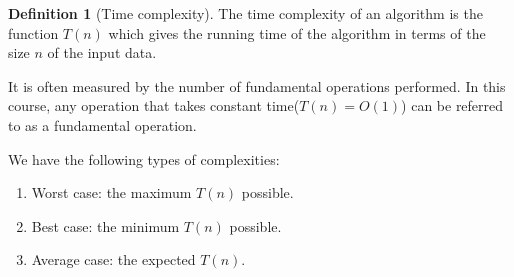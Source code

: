\documentclass[10pt, a4paper]{extarticle}
\theoremstyle{definition}
\newtheorem{defn}{Definition}
\begin{document}
	\begin{defn}[Time complexity]
		The time complexity of an algorithm is the function $T(n)$ which gives the running time of the algorithm in terms of the size $n$ of the input data.

		It is often measured by the number of fundamental operations performed. In this course, any operation that takes constant time($T(n)=O(1)$) can be referred to as a fundamental operation.

		We have the following types of complexities:
		\begin{enumerate}
			\item Worst case: the maximum $T(n)$ possible.
			\item Best case: the minimum $T(n)$ possible.
			\item Average case: the expected $T(n)$.
	\end{enumerate}
	\end{defn}
\end{document}

